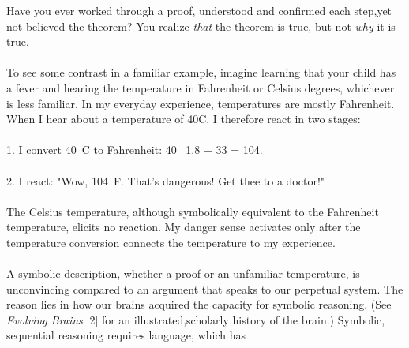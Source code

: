 \documentclass [a4paper]{article}
\begin{document}
\vspace*{5mm}
\pagestyle{fancy}
\begin{justify}
\Large Have you ever worked through a proof, understood and confirmed each step,yet not believed the theorem? You realize \textit{that} the theorem is true, but not \textit{why} it is true.\\
\vspace*{0.02mm}\\
To see some contrast in a familiar example, imagine learning that your child has a fever and hearing the temperature in Fahrenheit or Celsius degrees, whichever is less familiar. In my everyday experience, temperatures are mostly Fahrenheit. When I hear about a temperature of 40\textdegree C, I therefore react in two stages:\\ 
\vspace*{2mm}\\
1. I convert 40\textdegree \ C to Fahrenheit: 40 \texttimes \ 1.8 + 33 = 104.\\
\vspace*{0.02mm}\\
2. I react: "Wow, 104\textdegree \ F. That's dangerous! Get thee to a doctor!"\\
\vspace*{0.02mm}\\
The Celsius temperature, although symbolically equivalent to the Fahrenheit temperature, elicits no reaction. My danger sense activates only after the temperature conversion connects the temperature to my experience.\\
\vspace*{0.02mm}\\
A symbolic description, whether a proof or an unfamiliar temperature, is unconvincing compared to an argument that speaks to our perpetual system. The reason lies in how our brains acquired the capacity for symbolic reasoning. (See \textit{Evolving Brains} [2] for an illustrated,scholarly history of the brain.) Symbolic, sequential reasoning requires language, which has
\end{justify}
\end{document}
